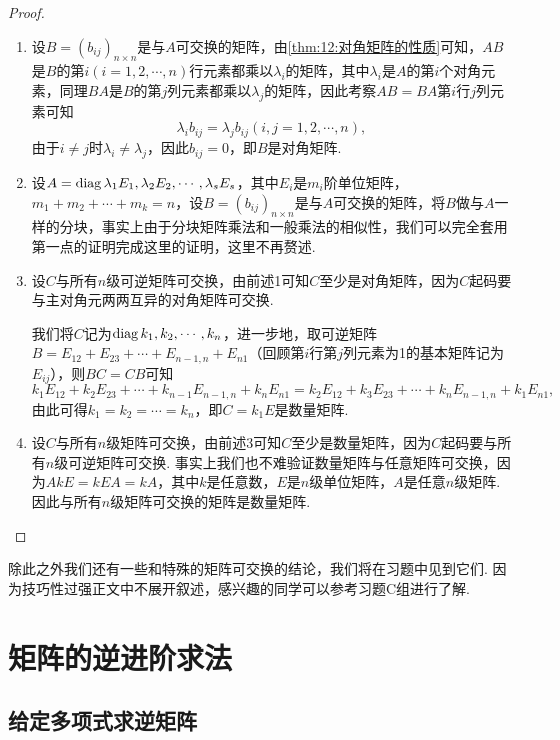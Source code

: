 \begin{proof}
    \begin{enumerate}
        \item 设$B=(b_{ij})_{n\times n}$是与$A$可交换的矩阵，由\autoref{thm:12:对角矩阵的性质}可知，$AB$是$B$的第$i(i=1,2,\cdots,n)$行元素都乘以$\lambda_i$的矩阵，其中$\lambda_i$是$A$的第$i$个对角元素，同理$BA$是$B$的第$j$列元素都乘以$\lambda_j$的矩阵，因此考察$AB=BA$第$i$行$j$列元素可知
        \[\lambda_ib_{ij}=\lambda_jb_{ij}(i,j=1,2,\cdots,n),\]
        由于$i\neq j$时$\lambda_i\neq\lambda_j$，因此$b_{ij}=0$，即$B$是对角矩阵.

        \item 设$A=\operatorname{diag}{\lambda_1E_1,\lambda_2E_2,\cdots,\lambda_sE_s}$，其中$E_i$是$m_i$阶单位矩阵，$m_1+m_2+\cdots+m_k=n$，设$B=(b_{ij})_{n\times n}$是与$A$可交换的矩阵，将$B$做与$A$一样的分块，事实上由于分块矩阵乘法和一般乘法的相似性，我们可以完全套用第一点的证明完成这里的证明，这里不再赘述.

        \item 设$C$与所有$n$级可逆矩阵可交换，由前述1可知$C$至少是对角矩阵，因为$C$起码要与主对角元两两互异的对角矩阵可交换.

        我们将$C$记为$\operatorname{diag}{k_1,k_2,\cdots,k_n}$，进一步地，取可逆矩阵$B=E_{12}+E_{23}+\cdots+E_{n-1,n}+E_{n1}$（回顾第$i$行第$j$列元素为1的基本矩阵记为$E_{ij}$），则$BC=CB$可知
        \[k_1E_{12}+k_2E_{23}+\cdots+k_{n-1}E_{n-1,n}+k_nE_{n1}=k_2E_{12}+k_3E_{23}+\cdots+k_nE_{n-1,n}+k_1E_{n1},\]
        由此可得$k_1=k_2=\cdots=k_n$，即$C=k_1E$是数量矩阵.

        \item 设$C$与所有$n$级矩阵可交换，由前述3可知$C$至少是数量矩阵，因为$C$起码要与所有$n$级可逆矩阵可交换. 事实上我们也不难验证数量矩阵与任意矩阵可交换，因为$AkE=kEA=kA$，其中$k$是任意数，$E$是$n$级单位矩阵，$A$是任意$n$级矩阵. 因此与所有$n$级矩阵可交换的矩阵是数量矩阵.
    \end{enumerate}
\end{proof}

除此之外我们还有一些和特殊的矩阵可交换的结论，我们将在习题中见到它们. 因为技巧性过强正文中不展开叙述，感兴趣的同学可以参考习题C组进行了解.

\section{矩阵的逆进阶求法}

\subsection{给定多项式求逆矩阵}

